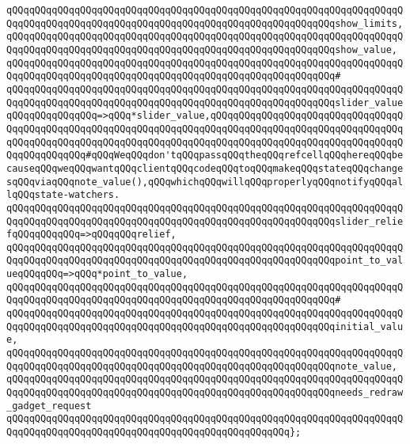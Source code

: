 \verb|qQQqqQQqqQQqqQQqqQQqqQQqqQQqqQQqqQQqqQQqqQQqqQQqqQQqqQQqqQQqqQQqqQQqqQQqqQQqqQQqqQQqqQQqqQQqqQQqqQQqqQQqqQQqqQQqqQQqqQQqqQQqqQQqshow_limits,|\newline
\verb|qQQqqQQqqQQqqQQqqQQqqQQqqQQqqQQqqQQqqQQqqQQqqQQqqQQqqQQqqQQqqQQqqQQqqQQqqQQqqQQqqQQqqQQqqQQqqQQqqQQqqQQqqQQqqQQqqQQqqQQqqQQqqQQqshow_value,|\newline
\verb|qQQqqQQqqQQqqQQqqQQqqQQqqQQqqQQqqQQqqQQqqQQqqQQqqQQqqQQqqQQqqQQqqQQqqQQqqQQqqQQqqQQqqQQqqQQqqQQqqQQqqQQqqQQqqQQqqQQqqQQqqQQqqQQq#|\newline
\verb|qQQqqQQqqQQqqQQqqQQqqQQqqQQqqQQqqQQqqQQqqQQqqQQqqQQqqQQqqQQqqQQqqQQqqQQqqQQqqQQqqQQqqQQqqQQqqQQqqQQqqQQqqQQqqQQqqQQqqQQqqQQqqQQqslider_valueqQQqqQQqqQQqqQQq=>qQQq*slider_value,qQQqqQQqqQQqqQQqqQQqqQQqqQQqqQQqqQQqqQQqqQQqqQQqqQQqqQQqqQQqqQQqqQQqqQQqqQQqqQQqqQQqqQQqqQQqqQQqqQQqqQQqqQQqqQQqqQQqqQQqqQQqqQQqqQQqqQQqqQQqqQQqqQQqqQQqqQQqqQQqqQQqqQQqqQQqqQQqqQQqqQQqqQQq#qQQqWeqQQqdon'tqQQqpassqQQqtheqQQqrefcellqQQqhereqQQqbecauseqQQqweqQQqwantqQQqclientqQQqcodeqQQqtoqQQqmakeqQQqstateqQQqchangesqQQqviaqQQqnote_value(),qQQqwhichqQQqwillqQQqproperlyqQQqnotifyqQQqallqQQqstate-watchers.|\newline
\verb|qQQqqQQqqQQqqQQqqQQqqQQqqQQqqQQqqQQqqQQqqQQqqQQqqQQqqQQqqQQqqQQqqQQqqQQqqQQqqQQqqQQqqQQqqQQqqQQqqQQqqQQqqQQqqQQqqQQqqQQqqQQqqQQqslider_reliefqQQqqQQqqQQq=>qQQqqQQqrelief,|\newline
\verb|qQQqqQQqqQQqqQQqqQQqqQQqqQQqqQQqqQQqqQQqqQQqqQQqqQQqqQQqqQQqqQQqqQQqqQQqqQQqqQQqqQQqqQQqqQQqqQQqqQQqqQQqqQQqqQQqqQQqqQQqqQQqqQQqpoint_to_valueqQQqqQQq=>qQQq*point_to_value,|\newline
\verb|qQQqqQQqqQQqqQQqqQQqqQQqqQQqqQQqqQQqqQQqqQQqqQQqqQQqqQQqqQQqqQQqqQQqqQQqqQQqqQQqqQQqqQQqqQQqqQQqqQQqqQQqqQQqqQQqqQQqqQQqqQQqqQQq#|\newline
\verb|qQQqqQQqqQQqqQQqqQQqqQQqqQQqqQQqqQQqqQQqqQQqqQQqqQQqqQQqqQQqqQQqqQQqqQQqqQQqqQQqqQQqqQQqqQQqqQQqqQQqqQQqqQQqqQQqqQQqqQQqqQQqqQQqinitial_value,|\newline
\verb|qQQqqQQqqQQqqQQqqQQqqQQqqQQqqQQqqQQqqQQqqQQqqQQqqQQqqQQqqQQqqQQqqQQqqQQqqQQqqQQqqQQqqQQqqQQqqQQqqQQqqQQqqQQqqQQqqQQqqQQqqQQqqQQqnote_value,|\newline
\verb|qQQqqQQqqQQqqQQqqQQqqQQqqQQqqQQqqQQqqQQqqQQqqQQqqQQqqQQqqQQqqQQqqQQqqQQqqQQqqQQqqQQqqQQqqQQqqQQqqQQqqQQqqQQqqQQqqQQqqQQqqQQqqQQqneeds_redraw_gadget_request|\newline
\verb|qQQqqQQqqQQqqQQqqQQqqQQqqQQqqQQqqQQqqQQqqQQqqQQqqQQqqQQqqQQqqQQqqQQqqQQqqQQqqQQqqQQqqQQqqQQqqQQqqQQqqQQqqQQqqQQqqQQqqQQq};|\newline
